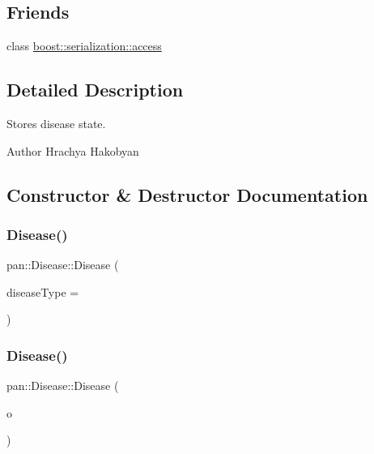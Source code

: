 \subsection*{Friends}
\begin{DoxyCompactItemize}
\item 
class \hyperlink{classpan_1_1_disease_ac98d07dd8f7b70e16ccb9a01abf56b9c}{boost\+::serialization\+::access}
\end{DoxyCompactItemize}


\subsection{Detailed Description}
Stores disease state. 

\begin{DoxyAuthor}{Author}
Hrachya Hakobyan 
\end{DoxyAuthor}


\subsection{Constructor \& Destructor Documentation}
\mbox{\label{classpan_1_1_disease_a5be3dc7f12596a1bc6221cad3faf5245}} 
\subsubsection{\texorpdfstring{Disease()}{Disease()}\hspace{0.1cm}{\footnotesize\ttfamily [1/2]}}
{\footnotesize\ttfamily pan\+::\+Disease\+::\+Disease (\begin{DoxyParamCaption}\item[{\hyperlink{namespacepan_a48851b51b0aef3f0e1be80df5031d9d7}{Disease\+Type}}]{disease\+Type = {} }\end{DoxyParamCaption})}

\mbox{\label{classpan_1_1_disease_a887d5b552c8c868211101b3ba349239b}} 
\subsubsection{\texorpdfstring{Disease()}{Disease()}\hspace{0.1cm}{\footnotesize\ttfamily [2/2]}}
{\footnotesize\ttfamily pan\+::\+Disease\+::\+Disease (\begin{DoxyParamCaption}\item[{const \hyperlink{classpan_1_1_disease}{Disease} \&}]{o }\end{DoxyParamCaption})}

